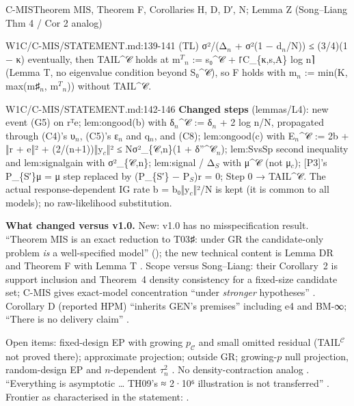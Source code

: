 \begin{card}{C-MIS}{Theorem MIS, Theorem F, Corollaries H, D, D′, N; Lemma Z (Song–Liang Thm 4 / Cor 2 analog)}
\begin{stmt}{W1C/C-MIS/STATEMENT.md:139-141}
(TL) σ²/(Δ$_{n}$ + σ²(1 − d$_{n}$/N)) ≤ (3/4)(1 − κ) eventually, then TAIL\^{}𝒞 holds at m$^{T}$$_{n}$ := s₀\^{}𝒞 + ⌈C\_\{κ,s,A\} log n⌉
(Lemma T, no eigenvalue condition beyond S₀\^{}𝒞), so F holds with m$_{n}$ := min(K, max(m♯$_{n}$, m$^{T}$$_{n}$)) without TAIL\^{}𝒞.
\end{stmt}
\begin{stmt}{W1C/C-MIS/STATEMENT.md:142-146}
\textbf{Changed steps} (lemmas/L4): new event (G5) on rᵀe; lem:ongood(b) with δ$_{n}$\^{}𝒞 := δ$_{n}$ + 2 log n/N, propagated through
(C4)'s υ$_{n}$, (C5)'s ε$_{n}$ and q$_{n}$, and (C8); lem:ongood(c) with E$_{n}$\^{}𝒞 := 2b + ‖r + e‖² + (2/(n+1))‖y$_{c}$‖²
≤ Nσ²\_\{𝒞,n\}(1 + δ''\^{}𝒞$_{n}$); lem:SvsSp second inequality and lem:signalgain with σ²\_\{𝒞,n\}; lem:signal / Δ$_{S}$ with μ\^{}𝒞
(not μ$_{c}$); [P3]'s P\_\{S′\}μ = μ step replaced by (P\_\{S′\} − P$_{S}$)r = 0; Step 0 → TAIL\^{}𝒞. The actual response-dependent IG
rate b = b₀‖y$_{c}$‖²/N is kept (it is common to all models); no raw-likelihood substitution.
\end{stmt}

\textbf{What changed versus v1.0.} New: v1.0 has no misspecification result. ``Theorem MIS is an exact reduction to T03♯: under GR the candidate-only problem \emph{is} a well-specified model'' (); the new technical content is Lemma DR and Theorem F with Lemma T . Scope versus Song--Liang: their Corollary~2 is support inclusion and Theorem~4 density consistency for a fixed-size candidate set; C-MIS gives exact-model concentration ``under \emph{stronger} hypotheses'' . Corollary D (reported HPM) ``inherits GEN's premises'' including e4 and BM-∞; ``There is no delivery claim'' .

\begin{notproved}
Open items: fixed-design EP with growing $p_{\mathcal C}$ and small omitted residual (TAIL$^{\mathcal C}$ not proved there); approximate projection; outside GR; growing-$p$ null projection, random-design EP and $n$-dependent $\tau_n^2$ . No density-contraction analog . ``Everything is asymptotic \ldots{} TH09's ≈ 2·10⁶ illustration is not transferred'' . Frontier as characterised in the statement: .
\end{notproved}
\end{card}

